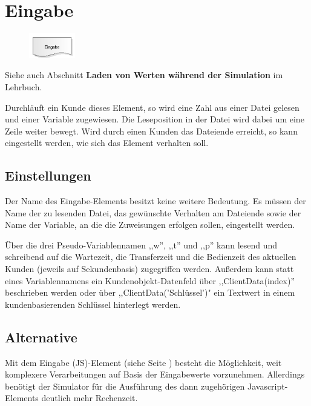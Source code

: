 \section{Eingabe}
\label{ref:ModelElementInput}

\begin{figure}
\vspace{-22pt}
\includegraphics[width=2cm]{imageModelElementInput.png}
\vspace{-22pt}
\end{figure}

Siehe auch Abschnitt \textbf{Laden von Werten während der Simulation} im Lehrbuch.

Durchläuft ein Kunde dieses Element, so wird eine Zahl aus einer Datei gelesen und einer
Variable zugewiesen. Die Leseposition in der Datei wird dabei um eine Zeile weiter bewegt.
Wird durch einen Kunden das Dateiende erreicht, so kann eingestellt werden, wie sich
das Element verhalten soll.

\subsection*{Einstellungen}

Der Name des Eingabe-Elements besitzt keine weitere Bedeutung. Es müssen der Name der zu lesenden
Datei, das gewünschte Verhalten am Dateiende sowie der Name der Variable, an die die Zuweisungen
erfolgen sollen, eingestellt werden.

Über die drei Pseudo-Variablennamen ,,w'', ,,t'' und ,,p'' kann lesend und schreibend auf die Wartezeit, die Transferzeit
und die Bedienzeit des aktuellen Kunden (jeweils auf Sekundenbasis) zugegriffen werden. Außerdem kann statt eines
Variablennamens ein Kundenobjekt-Datenfeld über ,,ClientData(index)'' beschrieben werden oder über ,,ClientData('Schlüssel')"
ein Textwert in einem kundenbasierenden Schlüssel hinterlegt werden.

\subsection*{Alternative}

Mit dem Eingabe (JS)-Element (siehe Seite \pageref{ref:ModelElementInputJS}) besteht die Möglichkeit, weit komplexere
Verarbeitungen auf Basis der Eingabewerte vorzunehmen. Allerdings benötigt der Simulator für die Ausführung
des dann zugehörigen Javascript-Elements deutlich mehr Rechenzeit.



